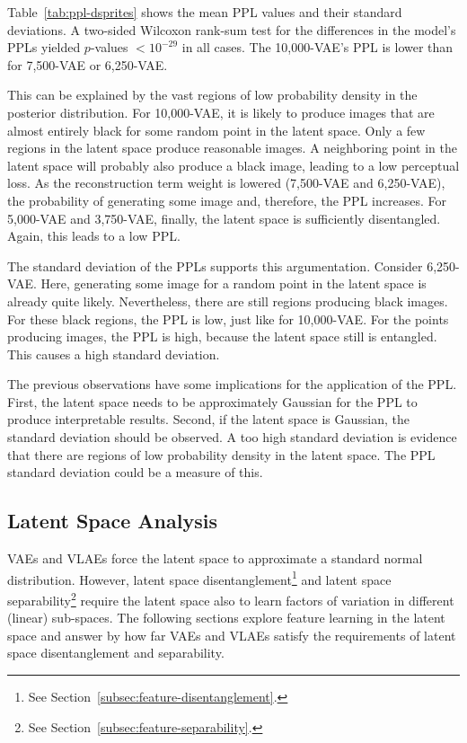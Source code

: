 Table~\ref{tab:ppl-dsprites} shows the mean \ac{PPL} values and their standard deviations.
A two-sided Wilcoxon rank-sum test for the differences in the model's \acp{PPL} yielded $p$-values $< 10^{-29}$ in all cases.
The 10,000-\ac{VAE}'s \ac{PPL} is lower than for 7,500-\ac{VAE} or 6,250-\ac{VAE}.

This can be explained by the vast regions of low probability density in the posterior distribution.
For 10,000-\ac{VAE}, it is likely to produce images that are almost entirely black for some random point in the latent space.
Only a few regions in the latent space produce reasonable images.
A neighboring point in the latent space will probably also produce a black image, leading to a low perceptual loss.
As the reconstruction term weight is lowered (7,500-\ac{VAE} and 6,250-\ac{VAE}), the probability of generating some image and, therefore, the \ac{PPL} increases.
For 5,000-\ac{VAE} and 3,750-\ac{VAE}, finally, the latent space is sufficiently disentangled.
Again, this leads to a low \ac{PPL}.

The standard deviation of the \acp{PPL} supports this argumentation.
Consider 6,250-\ac{VAE}.
Here, generating some image for a random point in the latent space is already quite likely.
Nevertheless, there are still  regions producing black images.
For these black regions, the \ac{PPL} is low, just like for 10,000-\ac{VAE}.
For the points producing images, the \ac{PPL} is high, because the latent space still is entangled.
This causes a high standard deviation.

The previous observations have some implications for the application of the \ac{PPL}.
First, the latent space needs to be approximately Gaussian for the \ac{PPL} to produce interpretable results.
Second, if the latent space is Gaussian, the standard deviation should be observed.
A too high standard deviation is evidence that there are regions of low probability density in the latent space.
The \ac{PPL} standard deviation could be a measure of this.

\subsection{Latent Space Analysis}\label{subsec:model-generated-samples}

\acp{VAE} and \acp{VLAE} force the latent space to approximate a standard normal distribution.
However, latent space disentanglement\footnote{See Section~\ref{subsec:feature-disentanglement}.} and latent space separability\footnote{See Section~\ref{subsec:feature-separability}.} require the latent space also to learn factors of variation in different (linear) sub-spaces.
The following sections explore feature learning in the latent space and answer by how far \acp{VAE} and \acp{VLAE} satisfy the requirements of latent space disentanglement and separability.

